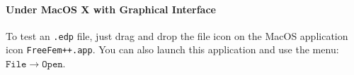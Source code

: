 \documentclass[a4paper,twoside,12pt]{book}
\begin{document}
\paragraph{Under MacOS X with Graphical Interface}

To test  an \texttt{.edp} file, just drag and drop
the file icon  on the MacOS application icon  \texttt{FreeFem++.app}.
You can also launch this application and use the menu:  $\mathtt{File} \rightarrow \mathtt{Open}$.
\end{document}
